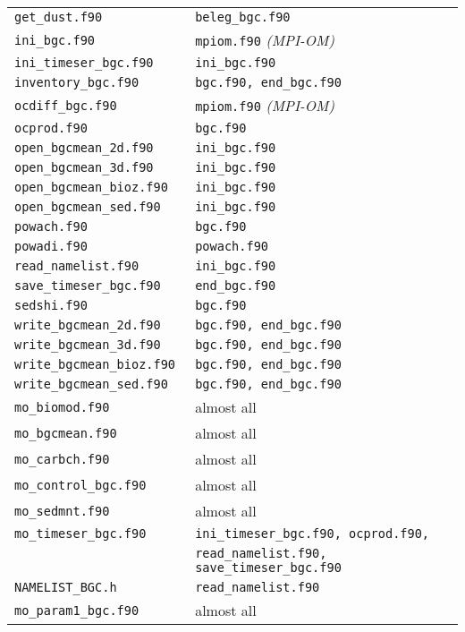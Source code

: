 \documentclass[11pt,a4paper,fleqn,twoside]{article}
\begin{document}
\begin{appendix}
\begin{tabular}{l|l}
{\tt  get\_dust.f90      }&  {\tt beleg\_bgc.f90}    \\ 
{\tt  ini\_bgc.f90         }&  {\tt mpiom.f90} {\em (MPI-OM)}   \\
{\tt  ini\_timeser\_bgc.f90 }&  {\tt ini\_bgc.f90}    \\ 
{\tt  inventory\_bgc.f90 }&  {\tt bgc.f90, end\_bgc.f90}    \\ 
{\tt  ocdiff\_bgc.f90     }&   {\tt mpiom.f90} {\em (MPI-OM)}   \\ 
{\tt  ocprod.f90          }&  {\tt bgc.f90}    \\
{\tt  open\_bgcmean\_2d.f90 }&   {\tt ini\_bgc.f90}   \\ 
{\tt  open\_bgcmean\_3d.f90 }&   {\tt ini\_bgc.f90}   \\ 
{\tt  open\_bgcmean\_bioz.f90 }& {\tt ini\_bgc.f90}   \\ 
{\tt  open\_bgcmean\_sed.f90 }&  {\tt ini\_bgc.f90}   \\ 
{\tt  powach.f90          }&  {\tt bgc.f90}    \\
{\tt  powadi.f90          }&  {\tt powach.f90}    \\
{\tt  read\_namelist.f90   }&  {\tt ini\_bgc.f90}   \\ 
{\tt  save\_timeser\_bgc.f90}&  {\tt end\_bgc.f90}   \\
{\tt  sedshi.f90         }&   {\tt bgc.f90}    \\ 
{\tt  write\_bgcmean\_2d.f90 }&   {\tt bgc.f90, end\_bgc.f90}   \\ 
{\tt  write\_bgcmean\_3d.f90 }&   {\tt bgc.f90, end\_bgc.f90}   \\ 
{\tt  write\_bgcmean\_bioz.f90 }&   {\tt bgc.f90, end\_bgc.f90}   \\ 
{\tt  write\_bgcmean\_sed.f90 }&   {\tt bgc.f90, end\_bgc.f90}   \\ 
{\tt mo\_biomod.f90      }&  almost all   \\
{\tt mo\_bgcmean.f90      }&  almost all   \\
{\tt mo\_carbch.f90      }&  almost all   \\
{\tt mo\_control\_bgc.f90 }&  almost all   \\
{\tt mo\_sedmnt.f90      }&  almost all   \\
{\tt mo\_timeser\_bgc.f90 }&  {\tt ini\_timeser\_bgc.f90, ocprod.f90, }  \\
&{\tt read\_namelist.f90, save\_timeser\_bgc.f90 }  \\ 
{\tt  NAMELIST\_BGC.h    }&  {\tt read\_namelist.f90}   \\
{\tt  mo\_param1\_bgc.f90      }&  almost all   \\ 
\end{tabular}
\normalsize


\end{appendix}
\end{document}
